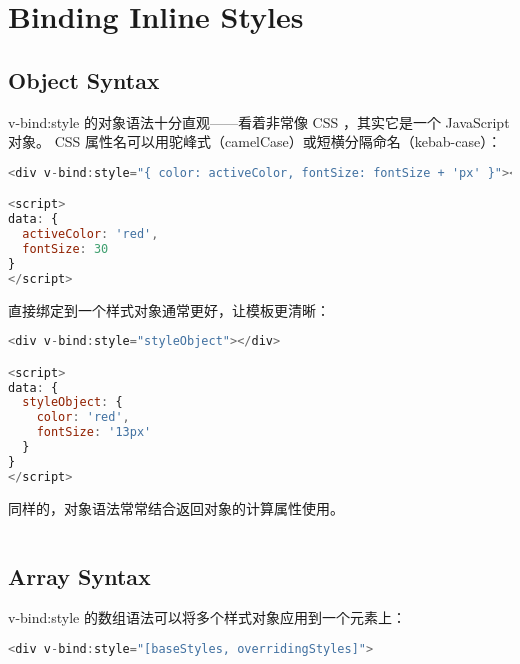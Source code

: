\section{Binding Inline Styles}



\subsection{Object Syntax}

v-bind:style 的对象语法十分直观——看着非常像 CSS ，其实它是一个 JavaScript 对象。 CSS 属性名可以用驼峰式（camelCase）或短横分隔命名（kebab-case）：


\begin{lstlisting}[language=JavaScript]
<div v-bind:style="{ color: activeColor, fontSize: fontSize + 'px' }"></div>

<script>
data: {
  activeColor: 'red',
  fontSize: 30
}
</script>
\end{lstlisting}

直接绑定到一个样式对象通常更好，让模板更清晰：


\begin{lstlisting}[language=JavaScript]
<div v-bind:style="styleObject"></div>

<script>
data: {
  styleObject: {
    color: 'red',
    fontSize: '13px'
  }
}
</script>
\end{lstlisting}

同样的，对象语法常常结合返回对象的计算属性使用。

\begin{lstlisting}[language=JavaScript]

\end{lstlisting}



\subsection{Array Syntax}

v-bind:style 的数组语法可以将多个样式对象应用到一个元素上：


\begin{lstlisting}[language=JavaScript]
<div v-bind:style="[baseStyles, overridingStyles]">
\end{lstlisting}



\begin{lstlisting}[language=JavaScript]

\end{lstlisting}



